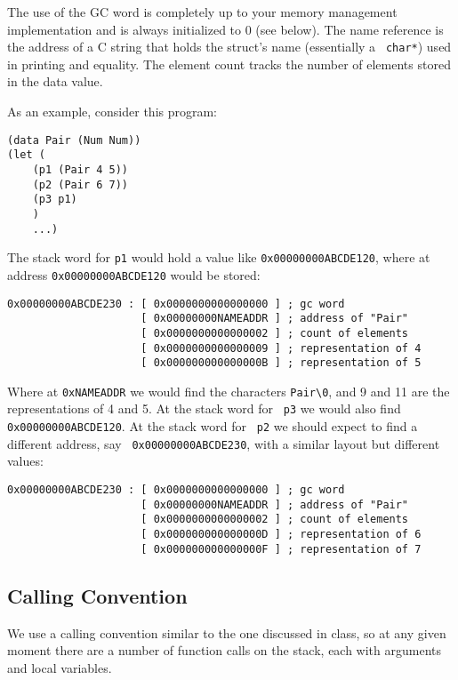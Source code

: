 \documentclass[10pt, oneside]{article}
\begin{document}
The use of the GC word is completely up to your memory management
implementation and is always initialized to 0 (see below). The name reference
is the address of a C string that holds the struct's name (essentially a {\tt
char*}) used in printing and equality. The element count tracks the number of
elements stored in the data value.

As an example, consider this program:

\begin{lstlisting}
(data Pair (Num Num))
(let (
    (p1 (Pair 4 5))
    (p2 (Pair 6 7))
    (p3 p1)
    )
    ...)
\end{lstlisting}

The stack word for {\tt p1} would hold a value like {\tt 0x00000000ABCDE120}, where
at address {\tt 0x00000000ABCDE120} would be stored:

\begin{verbatim}
0x00000000ABCDE230 : [ 0x0000000000000000 ] ; gc word
                     [ 0x00000000NAMEADDR ] ; address of "Pair"
                     [ 0x0000000000000002 ] ; count of elements
                     [ 0x0000000000000009 ] ; representation of 4
                     [ 0x000000000000000B ] ; representation of 5
\end{verbatim}

Where at {\tt 0xNAMEADDR} we would find the characters {\tt Pair\verb+\+0},
and 9 and 11 are the representations of 4 and 5. At the stack word for {\tt
p3} we would also find {\tt 0x00000000ABCDE120}. At the stack word for {\tt
p2} we should expect to find a different address, say {\tt
0x00000000ABCDE230}, with a similar layout but different values:

\begin{verbatim}
0x00000000ABCDE230 : [ 0x0000000000000000 ] ; gc word
                     [ 0x00000000NAMEADDR ] ; address of "Pair"
                     [ 0x0000000000000002 ] ; count of elements
                     [ 0x000000000000000D ] ; representation of 6
                     [ 0x000000000000000F ] ; representation of 7
\end{verbatim}

\subsection*{Calling Convention}

We use a calling convention similar to the one discussed in class, so at any
given moment there are a number of function calls on the stack, each with
arguments and local variables.
\end{document}
